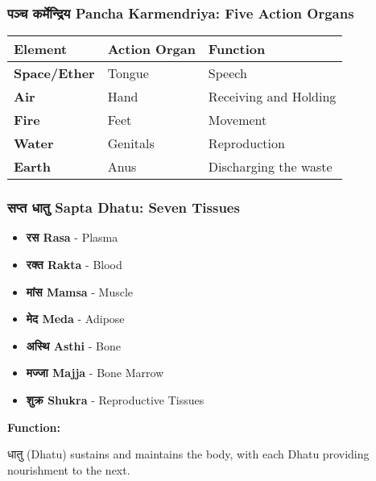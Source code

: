 \begin{frame}[fragile]\frametitle{पञ्च कर्मेन्द्रिय Pancha Karmendriya: Five Action Organs}
    \begin{tabular}{|l|l|l|}
    \hline
    \textbf{Element} & \textbf{Action Organ} & \textbf{Function} \\
    \hline
    \textbf{Space/Ether} & Tongue & Speech \\
    \hline
    \textbf{Air} & Hand & Receiving and Holding \\
    \hline
    \textbf{Fire} & Feet & Movement \\
    \hline
    \textbf{Water} & Genitals & Reproduction \\
    \hline
    \textbf{Earth} & Anus & Discharging the waste \\
    \hline
    \end{tabular}
\end{frame}

\begin{frame}[fragile]\frametitle{सप्त धातु  Sapta Dhatu: Seven Tissues}
    \begin{itemize}
        \item \textbf{रस  Rasa} - Plasma
        \item \textbf{रक्त  Rakta} - Blood
        \item \textbf{मांस  Mamsa} - Muscle
        \item \textbf{मेद  Meda} - Adipose
        \item \textbf{अस्थि Asthi} - Bone
        \item \textbf{मज्जा Majja} - Bone Marrow
        \item \textbf{शुक्र Shukra} - Reproductive Tissues
    \end{itemize}
    \vspace{0.5cm}
    \textbf{Function:} 
    
    धातु (Dhatu) sustains and maintains the body, with each Dhatu providing nourishment to the next.
    
\end{frame}

